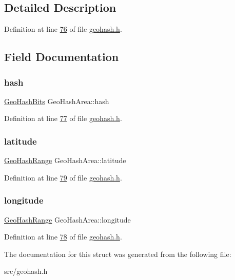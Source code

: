 \subsection{Detailed Description}


Definition at line \hyperlink{geohash_8h_source_l00076}{76} of file \hyperlink{geohash_8h_source}{geohash.\+h}.



\subsection{Field Documentation}
\mbox{\label{structGeoHashArea_a34e84c608242e72dac8643104a51e0e1}} 
\subsubsection{\texorpdfstring{hash}{hash}}
{\footnotesize\ttfamily \hyperlink{structGeoHashBits}{Geo\+Hash\+Bits} Geo\+Hash\+Area\+::hash}



Definition at line \hyperlink{geohash_8h_source_l00077}{77} of file \hyperlink{geohash_8h_source}{geohash.\+h}.

\mbox{\label{structGeoHashArea_a7ca5883bf7c8b3404743d3618b3f62c2}} 
\subsubsection{\texorpdfstring{latitude}{latitude}}
{\footnotesize\ttfamily \hyperlink{structGeoHashRange}{Geo\+Hash\+Range} Geo\+Hash\+Area\+::latitude}



Definition at line \hyperlink{geohash_8h_source_l00079}{79} of file \hyperlink{geohash_8h_source}{geohash.\+h}.

\mbox{\label{structGeoHashArea_a5c5319cf44c7f8181d5883d01055ef62}} 
\subsubsection{\texorpdfstring{longitude}{longitude}}
{\footnotesize\ttfamily \hyperlink{structGeoHashRange}{Geo\+Hash\+Range} Geo\+Hash\+Area\+::longitude}



Definition at line \hyperlink{geohash_8h_source_l00078}{78} of file \hyperlink{geohash_8h_source}{geohash.\+h}.



The documentation for this struct was generated from the following file\+:\begin{DoxyCompactItemize}
\item 
src/geohash.\+h\end{DoxyCompactItemize}
